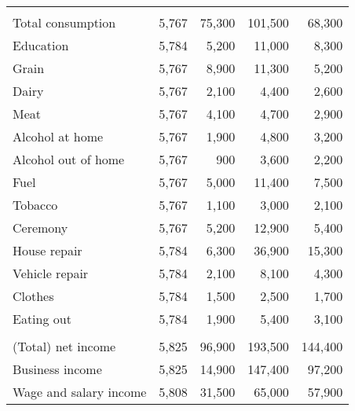 \documentclass{report}
\begin{document}
\begin{table}[H]
{\begin{tabular}{lrrrr}
\addlinespace[0.3em]
\multicolumn{5}{l}{\textbf{Consumption variables}}\\
\hspace{1em}Total consumption & 5,767 & 75,300 & 101,500 & 68,300\\
\hspace{1em}Education & 5,784 & 5,200 & 11,000 & 8,300\\
\hspace{1em}Grain & 5,767 & 8,900 & 11,300 & 5,200\\
\hspace{1em}Dairy & 5,767 & 2,100 & 4,400 & 2,600\\
\hspace{1em}Meat & 5,767 & 4,100 & 4,700 & 2,900\\
\hspace{1em}Alcohol at home & 5,767 & 1,900 & 4,800 & 3,200\\
\hspace{1em}Alcohol out of home & 5,767 & 900 & 3,600 & 2,200\\
\hspace{1em}Fuel & 5,767 & 5,000 & 11,400 & 7,500\\
\hspace{1em}Tobacco & 5,767 & 1,100 & 3,000 & 2,100\\
\hspace{1em}Ceremony & 5,767 & 5,200 & 12,900 & 5,400\\
\hspace{1em}House repair & 5,784 & 6,300 & 36,900 & 15,300\\
\hspace{1em}Vehicle repair & 5,784 & 2,100 & 8,100 & 4,300\\
\hspace{1em}Clothes & 5,784 & 1,500 & 2,500 & 1,700\\
\hspace{1em}Eating out & 5,784 & 1,900 & 5,400 & 3,100\\
\addlinespace[0.3em]
\multicolumn{5}{l}{\textbf{Income and asset variables}}\\
\hspace{1em}(Total) net income & 5,825 & 96,900 & 193,500 & 144,400\\
\hspace{1em}Business income & 5,825 & 14,900 & 147,400 & 97,200\\
\hspace{1em}Wage and salary income & 5,808 & 31,500 & 65,000 & 57,900\\

\end{tabular}}
\end{table}
\end{document}
